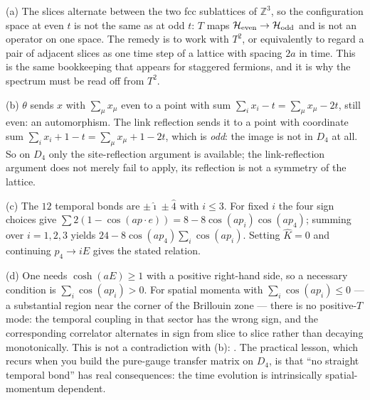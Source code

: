 {(a) The slices alternate between the two fcc sublattices of $\mathbb{Z}^3$, so
the configuration space at even $t$ is not the same as at odd $t$: $T$ maps
$\mathcal{H}_{\rm even}\to\mathcal{H}_{\rm odd}$ and is not an operator on one
space. The remedy is to work with $T^2$, or equivalently to regard a pair of
adjacent slices as one time step of a lattice with spacing $2a$ in time. This
is the same bookkeeping that appears for staggered fermions, and it is why the
spectrum must be read off from $T^2$.

(b) $\theta$ sends $x$ with $\sum_\mu x_\mu$ even to a point with sum
$\sum_i x_i - t = \sum_\mu x_\mu - 2t$, still even: an automorphism. The link
reflection sends it to a point with coordinate sum $\sum_i x_i + 1 - t
= \sum_\mu x_\mu +1 -2t$, which is \emph{odd}: the image is not in $D_4$ at all.
So on $D_4$ only the site-reflection argument is available; the link-reflection
argument does not merely fail to apply, its reflection is not a symmetry of the
lattice.

(c) The $12$ temporal bonds are $\pm\hat\imath\pm\hat4$ with $i\le3$. For fixed
$i$ the four sign choices give
$\sum 2(1-\cos(a p\!\cdot\!e)) = 8 - 8\cos(ap_i)\cos(ap_4)$; summing over
$i=1,2,3$ yields $24 - 8\cos(ap_4)\sum_i\cos(ap_i)$. Setting
$\widehat{K}=0$ and continuing $p_4\to iE$ gives the stated relation.

(d) One needs $\cosh(aE)\ge1$ with a positive right-hand side, so a necessary
condition is $\sum_i\cos(ap_i)>0$. For spatial momenta with
$\sum_i \cos(ap_i)\le0$ --- a substantial region near the corner of the
Brillouin zone --- there is no positive-$T$ mode: the temporal coupling in that
sector has the wrong sign, and the corresponding correlator alternates in sign
from slice to slice rather than decaying monotonically. This is not a
contradiction with (b): . The practical lesson, which recurs when
you build the pure-gauge transfer matrix on $D_4$, is that ``no straight
temporal bond'' has real consequences: the time evolution is intrinsically
spatial-momentum dependent.}

